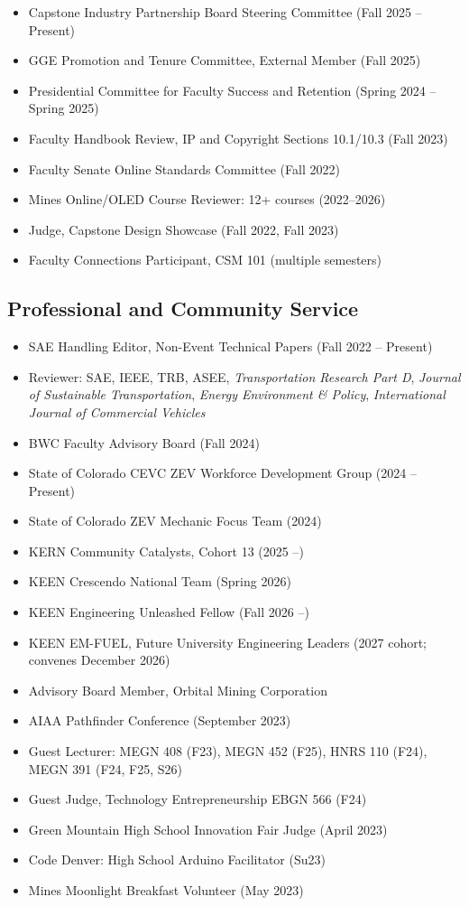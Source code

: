 \documentclass[11pt,letterpaper]{article}
\begin{document}
\begin{itemize}
  \item Capstone Industry Partnership Board Steering Committee (Fall 2025 -- Present)
  \item GGE Promotion and Tenure Committee, External Member (Fall 2025)
  \item Presidential Committee for Faculty Success and Retention
        (Spring 2024 -- Spring 2025)
  \item Faculty Handbook Review, IP and Copyright Sections 10.1/10.3 (Fall 2023)
  \item Faculty Senate Online Standards Committee (Fall 2022)
  \item Mines Online/OLED Course Reviewer: 12+ courses (2022--2026)
  \item Judge, Capstone Design Showcase (Fall 2022, Fall 2023)
  \item Faculty Connections Participant, CSM 101 (multiple semesters)
\end{itemize}

\subsection{Professional and Community Service}

\begin{itemize}
  \item SAE Handling Editor, Non-Event Technical Papers (Fall 2022 -- Present)
  \item Reviewer: SAE, IEEE, TRB, ASEE, \textit{Transportation Research Part D},
        \textit{Journal of Sustainable Transportation}, \textit{Energy Environment \&
        Policy}, \textit{International Journal of Commercial Vehicles}
  \item BWC Faculty Advisory Board (Fall 2024)
  \item State of Colorado CEVC ZEV Workforce Development Group (2024 -- Present)
  \item State of Colorado ZEV Mechanic Focus Team (2024)
  \item KERN Community Catalysts, Cohort 13 (2025 --)
  \item KEEN Crescendo National Team (Spring 2026)
  \item KEEN Engineering Unleashed Fellow (Fall 2026 --)
  \item KEEN EM-FUEL, Future University Engineering Leaders (2027 cohort; convenes December 2026)
  \item Advisory Board Member, Orbital Mining Corporation
  \item AIAA Pathfinder Conference (September 2023)
  \item Guest Lecturer: MEGN 408 (F23), MEGN 452 (F25), HNRS 110 (F24),
        MEGN 391 (F24, F25, S26)
  \item Guest Judge, Technology Entrepreneurship EBGN 566 (F24)
  \item Green Mountain High School Innovation Fair Judge (April 2023)
  \item Code Denver: High School Arduino Facilitator (Su23)
  \item Mines Moonlight Breakfast Volunteer (May 2023)
\end{itemize}
\end{document}
